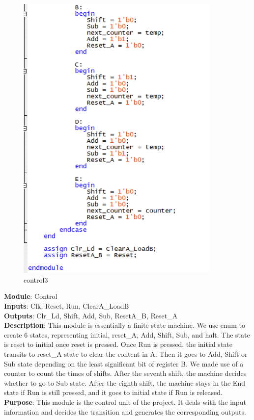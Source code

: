\documentclass[12pt]{article}
\begin{document}
\begin{figure}[H]
    \centering
    \includegraphics[width=10cm]{control3.png}
    \caption{control3}
\end{figure}
\textbf{Module}: Control \\ 
\textbf{Inputs}: Clk, Reset, Run, ClearA\_LoadB \\ 
\textbf{Outputs}: Clr\_Ld, Shift, Add, Sub, ResetA\_B, Reset\_A \\ 
\textbf{Description}: This module is essentially a finite state machine. We use enum to create 6 states, representing initial, reset\_A, Add, Shift, Sub, and halt. The state is reset to initial once reset is pressed. Once Run is pressed, the initial state transits to reset\_A state to clear the content in A. Then it goes to Add, Shift or Sub state depending on the least significant bit of register B. We made use of a counter to count the times of shifts. After the seventh shift, the machine decides whether to go to Sub state. After the eighth shift, the machine stays in the End state if Run is still pressed, and it goes to initial state if Run is released. \\ 
\textbf{Purpose}: This module is the control unit of the project. It deals with the input information and decides the transition and generates the corresponding outputs. \\
\end{document}
